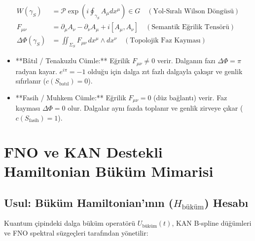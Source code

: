 \documentclass[11pt, a4paper]{article}
\begin{document}
\begin{align}
W(\gamma_S) &= \mathcal{P} \exp \left( i \oint_{\gamma_S} A_\mu dx^\mu \right) \in G \quad (\text{Yol-Sıralı Wilson Döngüsü}) \\
F_{\mu\nu} &= \partial_\mu A_\nu - \partial_\nu A_\mu + i [A_\mu, A_\nu] \quad (\text{Semantik Eğrilik Tensörü}) \\
\Delta \Phi(\gamma_S) &= \iint_{\Sigma_S} F_{\mu\nu} \, dx^\mu \wedge dx^\nu \quad (\text{Topolojik Faz Kayması})
\end{align}

\begin{itemize}
    \item **Bâtıl / Tenakuzlu Cümle:** Eğrilik $F_{\mu\nu} \neq 0$ verir. Dalganın fazı $\Delta \Phi = \pi$ radyan kayar. $e^{i\pi} = -1$ olduğu için dalga zıt fazlı dalgayla çakışır ve genlik sıfırlanır ($c(S_{\text{batıl}}) = 0$).
    \item **Fasih / Muhkem Cümle:** Eğrilik $F_{\mu\nu} = 0$ (düz bağlantı) verir. Faz kayması $\Delta \Phi = 0$ olur. Dalgalar aynı fazda toplanır ve genlik zirveye çıkar ($c(S_{\text{fasih}}) = 1$).
\end{itemize}

\section{FNO ve KAN Destekli Hamiltonian Büküm Mimarisi}

\subsection{Usul: Büküm Hamiltonian'ının ($H_{\text{büküm}}$) Hesabı}
Kuantum çipindeki dalga büküm operatörü $U_{\text{büküm}}(t)$, KAN B-spline düğümleri ve FNO spektral süzgeçleri tarafından yönetilir:
\end{document}
